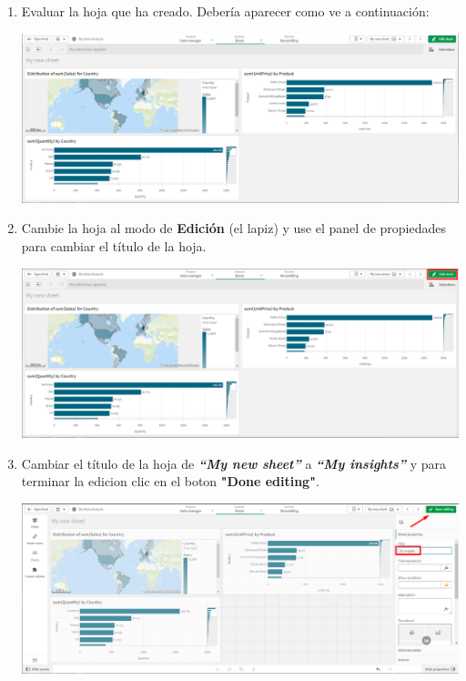 \documentclass[12pt,letterpaper]{article}
\newcommand\tab[1][1cm]{\hspace*{#1}}
\begin{document}
\begin{enumerate}[\tab 1.]
\begin{center}
        \end{center}
        \item Evaluar la hoja que ha creado. Debería aparecer como ve a continuación:
        \begin{center}
            \includegraphics[width=13cm]{./img/img13.png}
        \end{center}
        \item Cambie la hoja al modo de \textbf{Edición} (el lapiz) y use el panel de propiedades para cambiar el título de la hoja.
        \begin{center}
            \includegraphics[width=13cm]{./img/img14.png}
        \end{center}
        \item Cambiar el título de la hoja de \textit{\textbf{“My new sheet”}} a \textit{\textbf{“My insights”}} y para terminar la edicion  clic en el boton \textbf{"Done editing"}.
        \begin{center}
            \includegraphics[width=13cm]{./img/img15.png}
        \end{center}
    \end{enumerate}
    
\end{document}
